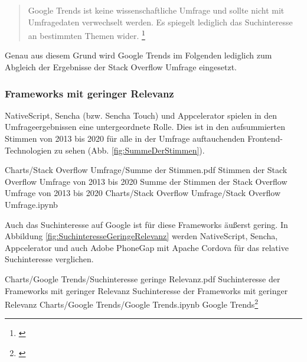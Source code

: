 \begin{quotation}
Google Trends ist keine wissenschaftliche Umfrage und sollte nicht mit Umfragedaten verwechselt werden.
Es spiegelt lediglich das Suchinteresse an bestimmten Themen wider.
\footnote{\cite{GoogleTrendsHilfe}}
\end{quotation}

Genau aus diesem Grund wird Google Trends im Folgenden lediglich zum Abgleich der Ergebnisse der Stack Overflow Umfrage eingesetzt.


\subsubsection{Frameworks mit geringer Relevanz}

NativeScript, Sencha (bzw.
Sencha Touch) und Appcelerator spielen in den Umfrageergebnissen eine untergeordnete Rolle.
Dies ist in den aufsummierten Stimmen von 2013 bis 2020 für alle in der Umfrage auftauchenden Frontend-Technologien zu sehen (Abb.
\ref{fig:SummeDerStimmen}).

\begin{alexfigurewithnotebook}{Charts/Stack Overflow Umfrage/Summe der Stimmen.pdf}
	{Stimmen der Stack Overflow Umfrage von 2013 bis 2020}
	{Summe der Stimmen der Stack Overflow Umfrage von 2013 bis 2020}
	{Charts/Stack Overflow Umfrage/Stack Overflow Umfrage.ipynb}
	{}

	\label{lst:Schritt1MassnahmenDeserialisierenOhneFehlerUnitTest}

\end{alexfigurewithnotebook}

Auch das Suchinteresse auf Google ist für diese Frameworks äußerst gering.
In Abbildung \ref{fig:SuchinteresseGeringeRelevanz} werden NativeScript, Sencha, Appcelerator und auch Adobe PhoneGap mit Apache Cordova für das relative Suchinteresse verglichen.

\begin{alexfigurewithnotebook}{Charts/Google Trends/Suchinteresse geringe Relevanz.pdf}
	{Suchinteresse der Frameworks mit geringer Relevanz}
	{Suchinteresse der Frameworks mit geringer Relevanz}
	{Charts/Google Trends/Google Trends.ipynb}
	{Google Trends\footnote{\cite{FaqPhoneGapDocs}}}
	\label{fig:SuchinteresseGeringeRelevanz}

\end{alexfigurewithnotebook}

